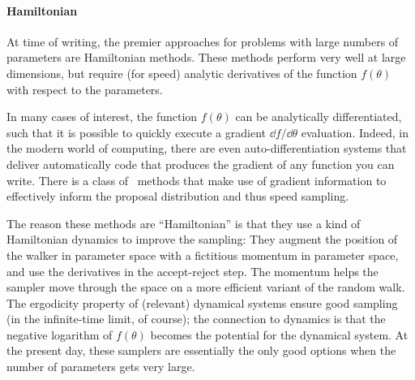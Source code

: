 \documentclass[modern]{aastex61}
\newcommand{\MCMC}{\acronym{MCMC}}
\newcommand{\pars}{\theta}
\begin{document}
\paragraph{Hamiltonian}
At time of writing, the premier approaches for problems with large numbers
  of parameters are Hamiltonian methods.
These methods perform very well at large dimensions, but require (for speed)
  analytic derivatives of the function $f(\pars)$ with respect to the parameters.

In many cases of interest, the function $f(\pars)$ can be analytically
differentiated, such that it is possible to quickly execute a gradient
$\dd f/\dd\pars$ evaluation.
Indeed, in the modern world of computing, there are even
auto-differentiation systems that deliver automatically code that
produces the gradient of any function you can write.
There is a class of \MCMC\ methods that make use of gradient information
to effectively inform the proposal distribution and thus speed sampling.

The reason these methods are ``Hamiltonian'' is that they use a kind of
  Hamiltonian dynamics to improve the sampling: They augment the position
  of the walker in parameter space with a fictitious momentum in
  parameter space, and use the derivatives in the accept-reject step.
The momentum helps the sampler move through the space on a more efficient
  variant of the random walk.
The ergodicity property of (relevant) dynamical systems ensure good sampling (in
  the infinite-time limit, of course); the connection to dynamics is that
  the negative logarithm of $f(\pars)$ becomes the potential for the
  dynamical system.
At the present day,
  these samplers are essentially the only good options when the number of
  parameters gets very large.
\end{document}
